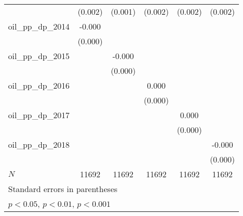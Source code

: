{\begin{tabular}{l*{5}{c}}
            &     (0.002)         &     (0.001)         &     (0.002)         &     (0.002)         &     (0.002)         \\
[1em]
oil\_pp\_dp\_2014&      -0.000         &                     &                     &                     &                     \\
            &     (0.000)         &                     &                     &                     &                     \\
[1em]
oil\_pp\_dp\_2015&                     &      -0.000         &                     &                     &                     \\
            &                     &     (0.000)         &                     &                     &                     \\
[1em]
oil\_pp\_dp\_2016&                     &                     &       0.000         &                     &                     \\
            &                     &                     &     (0.000)         &                     &                     \\
[1em]
oil\_pp\_dp\_2017&                     &                     &                     &       0.000         &                     \\
            &                     &                     &                     &     (0.000)         &                     \\
[1em]
oil\_pp\_dp\_2018&                     &                     &                     &                     &      -0.000         \\
            &                     &                     &                     &                     &     (0.000)         \\
\hline
\(N\)       &       11692         &       11692         &       11692         &       11692         &       11692         \\
\hline\hline
\multicolumn{6}{l}{\footnotesize Standard errors in parentheses}\\
\multicolumn{6}{l}{\footnotesize \sym{*} \(p<0.05\), \sym{**} \(p<0.01\), \sym{***} \(p<0.001\)}\\
\end{tabular}
}
